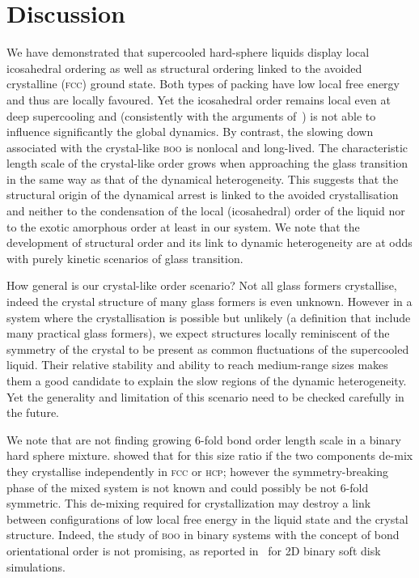 \section*{Discussion}
We have demonstrated that supercooled hard-sphere liquids display local icosahedral ordering as well as structural ordering linked to the avoided crystalline (\textsc{fcc}) ground state. Both types of packing have low local free energy and thus are locally favoured. Yet the icosahedral order remains local even at deep supercooling and (consistently with the arguments of~\citep{Berthier2007}) is not able to influence significantly the global dynamics. By contrast, the slowing down associated with the crystal-like \textsc{boo} is nonlocal and long-lived. The characteristic length scale of the crystal-like order grows when approaching the glass transition in the same way as that of the dynamical heterogeneity. This suggests that the structural origin of the dynamical arrest is linked to the avoided crystallisation and neither to the condensation of the local (icosahedral) order of the liquid nor to the exotic amorphous order at least in our system. We note that the development of structural order and its link to dynamic heterogeneity are at odds with purely kinetic scenarios of glass transition.

How general is our crystal-like order scenario? Not all glass formers crystallise, indeed the crystal structure of many glass formers is even unknown. However in a system where the crystallisation is possible but unlikely (a definition that include many practical glass formers), we expect structures locally reminiscent of the symmetry of the crystal to be present as common fluctuations of the supercooled liquid. Their relative stability and ability to reach medium-range sizes makes them a good candidate to explain the slow regions of the dynamic heterogeneity. Yet the generality and limitation of this scenario need to be checked carefully in the future.

We note that \citet{Charbonneau} are not finding growing 6-fold bond order length scale in a binary hard sphere mixture. \citet{Hopkins2011b,Hopkins2012} showed that for this size ratio if the two components de-mix they crystallise independently in \textsc{fcc} or \textsc{hcp}; however the symmetry-breaking phase of the mixed system is not known and could possibly be not 6-fold symmetric. This de-mixing required for crystallization may destroy a link between configurations of low local free energy in the liquid state and the crystal structure. Indeed, the study of \textsc{boo} in binary systems with the concept of bond orientational order is not promising, as reported in~\citep{tanaka2010critical, KawasakiJPCM} for 2D binary soft disk simulations.

